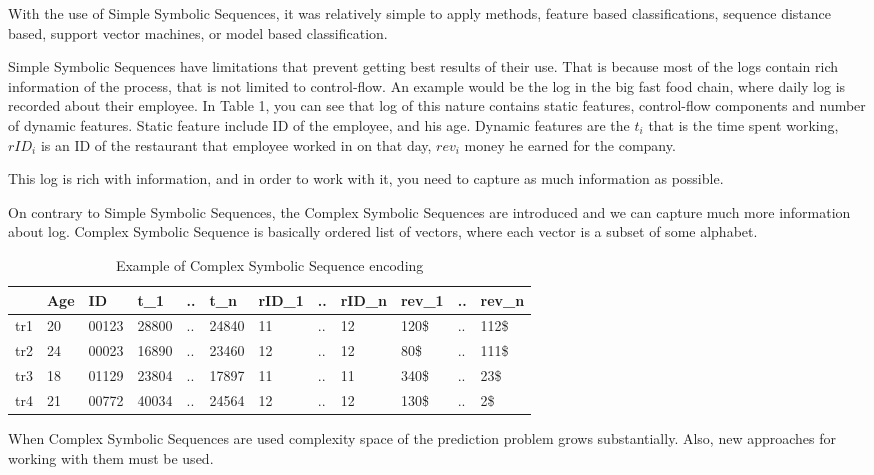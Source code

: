 With the use of Simple Symbolic Sequences, it was relatively simple to apply methods, feature based classifications, sequence distance based, support vector machines, or model based classification.~\cite{Xing:2010:BSS:1882471.1882478}

Simple Symbolic Sequences have limitations that prevent getting best results of their use.
That is because most of the logs contain rich information of the process, that is not limited to control-flow. An example would be the log in the big fast food chain, where daily log is recorded about their employee. In Table 1, you can see that log of this nature contains static features, control-flow components and number of dynamic features. Static feature include ID of the employee, and his age. Dynamic features are the $t_i$ that is the time spent working, $rID_i$ is an ID of the restaurant that employee worked in on that day, $rev_i$ money he earned for the company. 

This log is rich with information, and in order to work with it, you need to capture as much information as possible.

On contrary to Simple Symbolic Sequences, the Complex Symbolic Sequences are introduced and we can capture much more information about log. Complex Symbolic Sequence is basically ordered list of vectors, where each vector is a subset of some alphabet.

\begin{table}[h]
	\centering
	\begin{tabular}{| l | l | l | l | l | l | l | l | l | l | l | l |}
		\hline
		& Age & ID & t\_1 & .. & t\_n & rID\_1 & .. & rID\_n & rev\_1 & .. & rev\_n \\	
		\hline
		tr1 & 20 & 00123 & 28800 & .. & 24840 & 11 & .. & 12 & 120\$ & .. & 112\$ \\
		tr2 & 24 & 00023 & 16890 & .. & 23460 & 12 & .. & 12 & 80\$ & .. & 111\$ \\
		tr3 & 18 & 01129 & 23804 & .. & 17897 & 11 & .. & 11 & 340\$ & .. & 23\$ \\
		tr4 & 21 & 00772 & 40034 & .. & 24564 & 12 & .. & 12 & 130\$ & .. & 2\$ \\
		\hline
		
	\end{tabular}
	\caption{Example of Complex Symbolic Sequence encoding}
	\label{tab:statements}
\end{table}



When Complex Symbolic Sequences are used complexity space of the prediction problem grows substantially. Also, new approaches for working with them must be used. 

